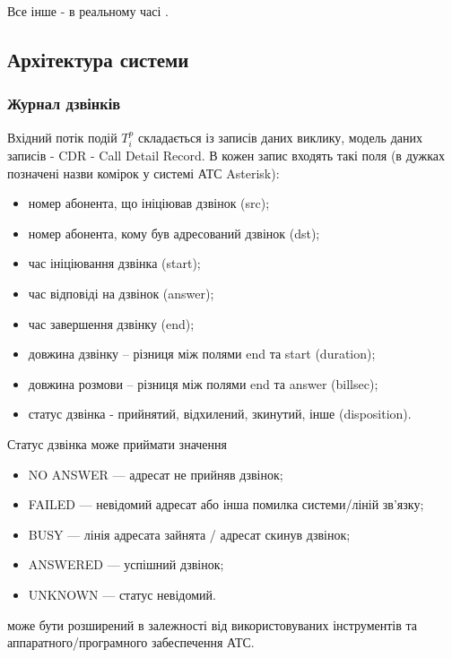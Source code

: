 	Все інше - в реальному часі \TBD.

\subsection{Архітектура системи}

\subsubsection{Журнал дзвінків}
  Вхідний потік подій ${T_i^p}$ складається із записів даних виклику, модель 
  даних записів - CDR - Call Detail Record. В кожен запис входять такі поля (в 
  дужках позначені назви комірок у системі АТС Asterisk):

   \begin{itemize}
    \item номер абонента, що ініціював дзвінок (src);
    \item номер абонента, кому був адресований дзвінок (dst);
    \item час ініціювання дзвінка (start);
    \item час відповіді на дзвінок (answer);
    \item час завершення дзвінку (end);
    \item довжина дзвінку -- різниця між полями end та start (duration);
    \item довжина розмови -- різниця між полями end та answer (billsec);
    \item статус дзвінка - прийнятий, відхилений, зкинутий, інше (disposition).
  \end{itemize}

  Статус дзвінка може приймати значення

  \begin{itemize}
    \item NO ANSWER --- адресат не прийняв дзвінок;
    \item FAILED --- невідомий адресат або інша помилка системи/ліній зв'язку;
    \item BUSY --- лінія адресата зайнята / адресат скинув дзвінок;
    \item ANSWERED --- успішний дзвінок;
    \item UNKNOWN --- статус невідомий.
  \end{itemize}

  може бути розширений в залежності від використовуваних інструментів та аппаратного/програмного забеспечення АТС.

